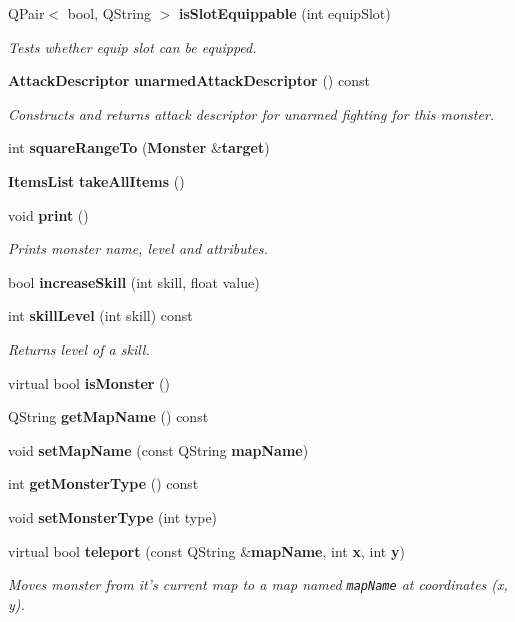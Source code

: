 \begin{CompactItemize}
QPair$<$ bool, QString $>$ {\bf is\-Slot\-Equippable} (int equip\-Slot)
\begin{CompactList}\small\item\em Tests whether equip slot can be equipped. \item\end{CompactList}\item 
{\bf Attack\-Descriptor} {\bf unarmed\-Attack\-Descriptor} () const 
\begin{CompactList}\small\item\em Constructs and returns attack descriptor for unarmed fighting for this monster. \item\end{CompactList}\item 
int {\bf square\-Range\-To} ({\bf Monster} \&{\bf target})
\item 
{\bf Items\-List} {\bf take\-All\-Items} ()
\item 
void {\bf print} ()
\begin{CompactList}\small\item\em Prints monster name, level and attributes. \item\end{CompactList}\item 
bool {\bf increase\-Skill} (int skill, float value)
\item 
int {\bf skill\-Level} (int skill) const 
\begin{CompactList}\small\item\em Returns level of a skill. \item\end{CompactList}\item 
virtual bool {\bf is\-Monster} ()
\item 
QString {\bf get\-Map\-Name} () const 
\item 
void {\bf set\-Map\-Name} (const QString {\bf map\-Name})
\item 
int {\bf get\-Monster\-Type} () const 
\item 
void {\bf set\-Monster\-Type} (int type)
\item 
virtual bool {\bf teleport} (const QString \&{\bf map\-Name}, int {\bf x}, int {\bf y})
\begin{CompactList}\small\item\em Moves monster from it's current map to a map named {\tt map\-Name} at coordinates (x, y). \item\end{CompactList}\item 

\end{CompactItemize}
